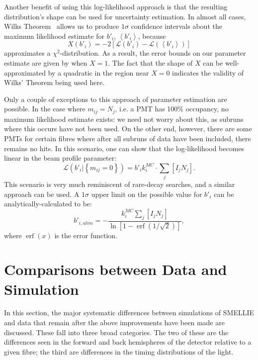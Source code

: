 Another benefit of using this log-likelihood approach is that the resulting distribution's shape can be used for uncertainty estimation. In almost all cases, Wilks Theorem~\cite{wilksLargeSampleDistributionLikelihood1938} allows us to produce $1 \sigma$ confidence intervals about the maximum likelihood estimate for $b'_{i}$, $\left<b'_{i}\right>$, because $$X(b'_{i}) = -2\left[\mathcal{L}\left(b'_{i}\right) - \mathcal{L}\left(\left<b'_{i}\right>\right)\right]$$ approximates a $\chi^2$-distribution. As a result, the error bounds on our parameter estimate are given by when $X = 1$. The fact that the shape of $X$ can be well-approximated by a quadratic in the region near $X = 0$ indicates the validity of Wilks' Theorem being used here.

Only a couple of exceptions to this approach of parameter estimation are possible. In the case where $m_{ij} = N_{j}$, i.e. a PMT has 100\% occupancy, no maximum likelihood estimate exists: we need not worry about this, as subruns where this occurs have not been used. On the other end, however, there are some PMTs for certain fibres where after all subruns of data have been included, there remains no hits. In this scenario, one can show that the log-likelihood becomes linear in the beam profile parameter:
\begin{equation}
    \mathcal{L}\left(b'_{i}|\left\{m_{ij}=0\right\}\right) = b'_{i}k_{i}^{MC}\cdot\sum_{j}\left[I_{j}N_{j}\right].
\end{equation}
This scenario is very much reminiscent of rare-decay searches, and a similar approach can be used. A $1 \sigma$ upper limit on the possible value for $b'_{i}$ can be analytically-calculated to be:
\begin{equation}
    b'_{i,ulim} = -\frac{k_{i}^{MC}\sum_{j}\left[I_{j}N_{j}\right]}{\ln\left[1 - \operatorname{erf}\left(1/\sqrt{2}\right)\right]},
\end{equation}
where $\operatorname{erf}(x)$ is the error function.

\section{Comparisons between Data and Simulation}\label{sec:smellie_systematics}
In this section, the major systematic differences between simulations of SMELLIE and data that remain after the above improvements have been made are discussed. These fall into three broad categories. The two of these are the differences seen in the forward and back hemispheres of the detector relative to a given fibre; the third are differences in the timing distributions of the light.

